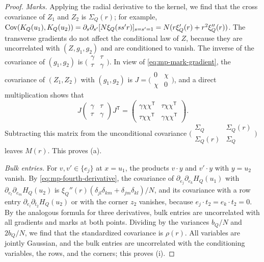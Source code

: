 \begin{proof}
\emph{Marks.} Applying the radial derivative to the kernel, we find that the cross covariance of $Z_1$ and $Z_2$ is $\Sigma_Q(r)$; for example, $\operatorname{Cov}(K_Q(u_1),K_Q(u_2))=\partial_s\partial_{s'}[N\xi_Q(ss'r)]_{s=s'=1}=N(r\xi_Q'(r)+r^2\xi_Q''(r))$. The transverse gradients do not affect the conditional law of $Z$, because they are uncorrelated with $(Z,g_1,g_2)$ and are conditioned to vanish. The inverse of the covariance of $(g_1,g_2)$ is $\bigl(\begin{smallmatrix}\gamma&\tau\\\tau&\gamma\end{smallmatrix}\bigr)$. In view of \eqref{eq:mp-mark-gradient}, the covariance of $(Z_1,Z_2)$ with $(g_1,g_2)$ is $J=\bigl(\begin{smallmatrix}0&\chi\\\chi&0\end{smallmatrix}\bigr)$, and a direct multiplication shows that
\[
J\begin{pmatrix}\gamma&\tau\\\tau&\gamma\end{pmatrix}J^{\mathsf T}=\begin{pmatrix}\gamma\chi\chi^{\mathsf T}&\tau\chi\chi^{\mathsf T}\\\tau\chi\chi^{\mathsf T}&\gamma\chi\chi^{\mathsf T}\end{pmatrix}.
\]
Subtracting this matrix from the unconditional covariance $\bigl(\begin{smallmatrix}\Sigma_Q&\Sigma_Q(r)\\\Sigma_Q(r)&\Sigma_Q\end{smallmatrix}\bigr)$ leaves $M(r)$. This proves (a).

\emph{Bulk entries.} For $v,v'\in\{e_j\}$ at $x=u_1$, the products $v\cdot y$ and $v'\cdot y$ with $y=u_2$ vanish. By \eqref{eq:mp-fourth-derivative}, the covariance of $\partial_{e_j}\partial_{e_k}H_Q(u_1)$ with $\partial_{e_l}\partial_{e_m}H_Q(u_2)$ is $\xi_Q''(r)(\delta_{jl}\delta_{km}+\delta_{jm}\delta_{kl})/N$, and its covariance with a row entry $\partial_{e_l}\partial_{t_2}H_Q(u_2)$ or with the corner $z_2$ vanishes, because $e_j\cdot t_2=e_k\cdot t_2=0$. By the analogous formula for three derivatives, bulk entries are uncorrelated with all gradients and marks at both points. Dividing by the variances $b_Q/N$ and $2b_Q/N$, we find that the standardized covariance is $\rho(r)$. All variables are jointly Gaussian, and the bulk entries are uncorrelated with the conditioning variables, the rows, and the corners; this proves (i).


\end{proof}
